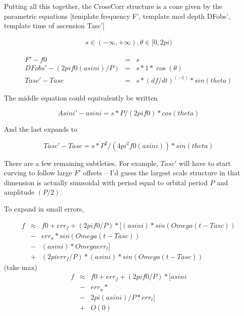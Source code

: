 \documentclass{article}
\begin{document}
Putting all this together, the CrossCorr structure is a cone given by
the parametric equations [template frequency F', template mod depth
DFobs', template time of ascension Tasc']

\begin{eqnarray}
s \in (-\infty, +\infty), \theta \in [0, 2 pi)
\end{eqnarray}

\begin{eqnarray}
F' - f0                        &=& s\\
DFobs' - (2 pi f0 (a sin i)/P) &=& s * 1 * \cos(\theta)\\
Tasc' - Tasc                   &=& s * (df/dt)^(-1) * sin(theta)
\end{eqnarray}

The middle equation could equivalently be written

\begin{equation}
Asini' - a sin i = s * P/(2 pi f0) * cos(theta)
\end{equation}

And the last expands to

\begin{equation}
Tasc' - Tasc     = s * P^2/(4 pi^2 f0 (a sin i)) * sin(theta)
\end{equation}

There are a few remaining subtleties. For example, $Tasc'$ will have to
start curving to follow large $F'$ offsets -- I'd guess the largest scale
structure in that dimension is actually sinusoidal with period equal to
orbital period $P$ and amplitude $(P/2)$.

To expand in small errors,

\begin{eqnarray}
f &\approx& f0 + err_f + (2pi f0/P)*[
                     (a sin i)*sin(Omega(t-Tasc)) \\
                   &-& err_a * sin(Omega(t-Tasc)) \\
                   &-& (a sin i) * Omega err_t] \\
                   &+& (2pi err_f/P)*(a sin i)*sin(Omega(t-Tasc))
\end{eqnarray}
  (take max)
\begin{eqnarray}
f &\approx& f0 + err_f + (2pi f0/P)*[
                     a sin i \\ 
                   &-& err_a * \\
                   &-& 2 pi (a sin i)/P * err_t] \\
                   &+& O(0)
\end{eqnarray}
\end{document}
